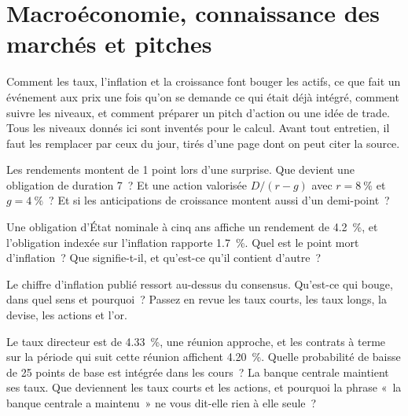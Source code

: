 \chapter{Macroéconomie, connaissance des marchés et pitches}\label{ch:iv2:macro-market-knowledge-and-pitches}

\begin{ivtrains}
Comment les taux, l'inflation et la croissance font bouger les actifs, ce que fait un événement aux prix une fois qu'on se demande ce qui était déjà intégré, comment suivre les niveaux, et comment préparer un pitch d'action ou une idée de trade. Tous les niveaux donnés ici sont inventés pour le calcul. Avant tout entretien, il faut les remplacer par ceux du jour, tirés d'une page dont on peut citer la source.
\end{ivtrains}

\begin{question}\label{iq:iv2:macro-market-knowledge-and-pitches:1}
Les rendements montent de 1 point lors d'une surprise. Que devient une obligation de duration 7~? Et une action valorisée $D/(r - g)$ avec $r = 8~\%$ et $g = 4~\%$~? Et si les anticipations de croissance montent aussi d'un demi-point~?
\end{question}

\begin{question}\label{iq:iv2:macro-market-knowledge-and-pitches:2}
Une obligation d'État nominale à cinq ans affiche un rendement de 4.2~\%, et l'obligation indexée sur l'inflation rapporte 1.7~\%. Quel est le point mort d'inflation~? Que signifie-t-il, et qu'est-ce qu'il contient d'autre~?
\end{question}

\begin{question}\label{iq:iv2:macro-market-knowledge-and-pitches:3}
Le chiffre d'inflation publié ressort au-dessus du consensus. Qu'est-ce qui bouge, dans quel sens et pourquoi~? Passez en revue les taux courts, les taux longs, la devise, les actions et l'or.
\end{question}

\begin{question}\label{iq:iv2:macro-market-knowledge-and-pitches:4}
Le taux directeur est de 4.33~\%, une réunion approche, et les contrats à terme sur la période qui suit cette réunion affichent 4.20~\%. Quelle probabilité de baisse de 25 points de base est intégrée dans les cours~? La banque centrale maintient ses taux. Que deviennent les taux courts et les actions, et pourquoi la phrase «~la banque centrale a maintenu~» ne vous dit-elle rien à elle seule~?
\end{question}

